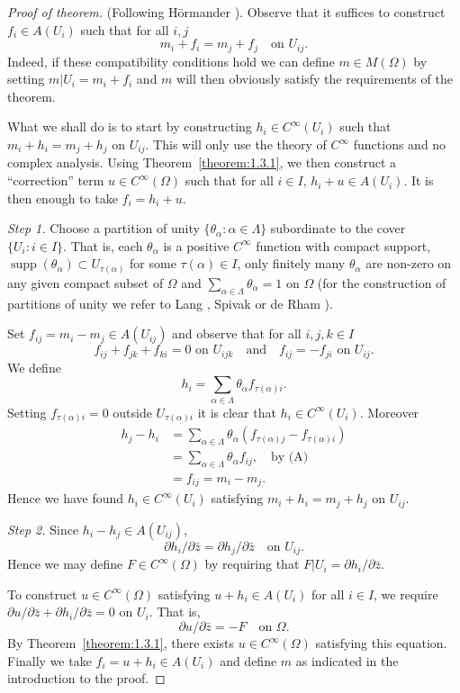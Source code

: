 \begin{proof}[Proof of theorem]
(Following H\"ormander \cite{bib:I:hormander-l:1}). Observe that it suffices to construct $f_i\in A(U_i)$ such that for all $i,j$
\[ m_i+f_i=m_j+f_j\quad\text{on }U_{ij}. \]
Indeed, if these compatibility conditions hold we can define $m\in M(\Omega)$ by setting $m|U_i=m_i+f_i$ and $m$ will then obviously satisfy the requirements of the theorem.

What we shall do is to start by constructing $h_i\in C^\infty(U_i)$ such that $m_i+h_i=m_j+h_j$ on $U_{ij}$. This will only use the theory of $C^\infty$ functions and no complex analysis. Using Theorem~\ref{theorem:1.3.1}, we then construct a ``correction'' term $u\in C^\infty(\Omega)$ such that for all $i\in I$, $h_i+u\in A(U_i)$. It is then enough to take $f_i=h_i+u$.

\textit{Step 1.} Choose a partition of unity $\{\theta_\alpha:\alpha\in\Lambda\}$ subordinate to the cover $\{U_i:i\in I\}$. That is, each $\theta_\alpha$ is a positive $C^\infty$ function with compact support, $\operatorname{supp}(\theta_\alpha)\subset U_{\tau(\alpha)}$ for some $\tau(\alpha)\in I$, only finitely many $\theta_\alpha$ are non-zero on any given compact subset of $\Omega$ and $\sum_{\alpha\in\Lambda}\theta_\alpha=1$ on $\Omega$ (for the construction of partitions of unity we refer to Lang \cite{bib:I:lang-s:1}, Spivak \cite{bib:I:spivak-m:1} or de Rham \cite{bib:I:de-rham-g:1}).

Set $f_{ij}=m_i-m_j\in A(U_{ij})$ and observe that for all $i,j,k\in I$
\begin{equation}
f_{ij}+f_{jk}+f_{ki}=0\text{ on }U_{ijk}\quad\text{and}\quad f_{ij}=-f_{ji}\text{ on }U_{ij}.\tag{A}\label{eq:1:a:1}
\end{equation}
We define
\[ h_i=\sum_{\alpha\in\Lambda}\theta_\alpha f_{\tau(\alpha)i}. \]
Setting $f_{\tau(\alpha)i}=0$ outside $U_{\tau(\alpha)i}$ it is clear that $h_i\in C^\infty(U_i)$. Moreover
\begin{align*}
h_j-h_i&=\sum_{\alpha\in\Lambda}\theta_\alpha(f_{\tau(\alpha)j}-f_{\tau(\alpha)i})\\
&=\sum_{\alpha\in\Lambda}\theta_\alpha f_{ij},\quad\text{by (A)}\\
&=f_{ij}=m_i-m_j.
\end{align*}
Hence we have found $h_i\in C^\infty(U_i)$ satisfying $m_i+h_i=m_j+h_j$ on $U_{ij}$.

\textit{Step 2.} Since $h_i-h_j\in A(U_{ij})$,
\[ \partial h_i/\partial\bar z=\partial h_j/\partial\bar z\quad\text{on }U_{ij}. \]
Hence we may define $F\in C^\infty(\Omega)$ by requiring that $F|U_i=\partial h_i/\partial\bar z$.

To construct $u\in C^\infty(\Omega)$ satisfying $u+h_i\in A(U_i)$ for all $i\in I$, we require $\partial u/\partial\bar z+\partial h_i/\partial\bar z=0$ on $U_i$. That is,
\[ \partial u/\partial\bar z=-F\quad\text{on }\Omega. \]
By Theorem~\ref{theorem:1.3.1}, there exists $u\in C^\infty(\Omega)$ satisfying this equation. Finally we take $f_i=u+h_i\in A(U_i)$ and define $m$ as indicated in the introduction to the proof.
\end{proof}
